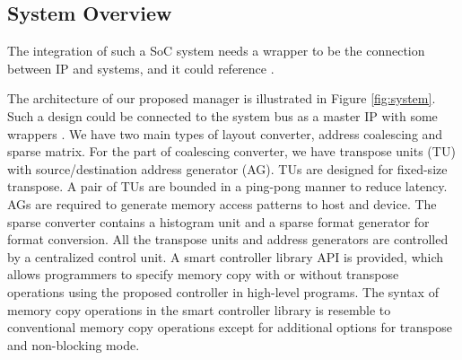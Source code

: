 \documentclass[10pt,journal,compsoc]{IEEEtran}
\begin{document}
\subsection{System Overview}
The integration of such a SoC system needs a wrapper to be the connection between IP and
systems, and it could reference \cite{ROSES_DAC}\cite{ROSES}.

The architecture of our proposed manager is illustrated in Figure \ref{fig:system}. Such a design could be connected
to the system bus as a master IP with some wrappers \cite{ROSES_DAC}\cite{ROSES}.
We have two main types of layout converter, address coalescing and sparse matrix.
For the part of coalescing converter, we have transpose units (TU) with source/destination address generator (AG).
TUs are designed for fixed-size transpose. A pair of TUs are bounded in a ping-pong manner to reduce latency.
AGs are required to generate memory access patterns to host and device. The sparse converter contains
a histogram unit and a sparse format generator for format conversion.
All the transpose units and address generators are controlled by a centralized control unit. A smart controller library API is provided, which allows programmers to specify memory copy
with or without transpose operations using the proposed controller in high-level programs.
The syntax of memory copy operations in the smart controller library is resemble to conventional memory copy operations except for additional options for transpose and non-blocking mode.
\end{document}
